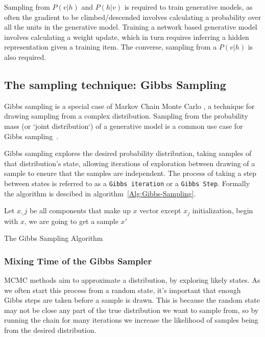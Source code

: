 Sampling from $P(v|h)$ and $P(h|v)$ is required to train generative models, as often the gradient to be climbed/descended involves calculating a probability over all the units in the generative model. Training a network based generative model involves calculating a weight update, which in turn requires inferring a hidden representation given a training item. The converse, sampling from a $P(v|h)$ is also required. 


\subsection{The sampling technique: Gibbs Sampling}

Gibbs sampling is a special case of Markov Chain Monte Carlo \cite{hastings70}, a technique for drawing sampling from a complex distribution. Sampling from the probability mass (or `joint distribution`) of a generative model is a common use case for Gibbs sampling~\cite{Pearl:1988:PRI:52121}.

Gibbs sampling explores the desired probability distribution, taking samples of that distribution's state, allowing iterations of exploration between drawing of a sample to ensure that the samples are independent\todocite{}. The process of taking a step between states is referred to as a \texttt{Gibbs iteration} or a \texttt{Gibbs Step}. Formally the algorithm is descibed in algorithm~\ref{Alg:Gibbs-Sampling}.

\begin{algorithm}[!ht]
 Let $ x_{\smallsetminus} j$ be all components that make up $x$ vector except $x_j$\;
 initialization, begin with $x$, we are going to get a sample $x'$\;
 \caption{The Gibbs Sampling Algorithm}\label{Alg:Gibbs-Sampling}
\end{algorithm}

\subsubsection{Mixing Time of the Gibbs Sampler}

MCMC methods aim to approximate a distribution, by exploring likely states. As we often start this process from a random state, it's important that enough Gibbs steps are taken before a sample is drawn. This is because the random state may not be close any part of the true distribution we want to sample from, so by running the chain for many iterations we increase the likelihood of samples being from the desired distribution.

